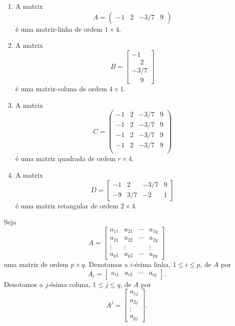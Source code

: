\begin{exemplo}
	\begin{enumerate}
		\item A matrix
		\[
			A = \begin{pmatrix}
				-1 & 2 & -3/7 & 9
			\end{pmatrix}
		\]
		é uma matriz-linha de ordem $1 \times 4$.
		\item A matrix
		\[
			B = \begin{bmatrix}
				-1 \\ \phantom{-}2 \\ -3/7 \\ \phantom{-}9
			\end{bmatrix}
		\]
		é uma matriz-coluna de ordem $4 \times 1$.
		\item A matrix
		\[
			C = \begin{pmatrix}
				-1 & 2 & -3/7 & 9\\
				-1 & 2 & -3/7 & 9\\
				-1 & 2 & -3/7 & 9\\
				-1 & 2 & -3/7 & 9\\
			\end{pmatrix}
		\]
		é uma matriz quadrada de ordem $r \times 4$.
		\item A matrix
		\[
			D = \begin{bmatrix}
				-1 & 2 & -3/7 & 9\\
				-9 & 3/7 & -2 & 1
			\end{bmatrix}
		\]
		é uma matriz retangular de ordem $2 \times 4$.
	\end{enumerate}
\end{exemplo}

Seja
\[
	A = \begin{bmatrix}
		a_{11} & a_{21} & \cdots & a_{1q}\\
		a_{21} & a_{22} & \cdots & a_{2q}\\
		\vdots & \vdots & & \vdots\\
		a_{p1} & a_{p2} & \cdots & a_{pq}
	\end{bmatrix}
\]
uma matriz de ordem $p\times q$. Denotamos a $i$-ésima linha, $1 \le i \le p$, de $A$ por
\[
	A_i = \begin{bmatrix}a_{i1} & a_{i2} & \cdots & a_{iq}\end{bmatrix}.
\]
Denotamos a $j$-ésima coluna, $1 \le j \le q$, de $A$ por
\[
	A^j = \begin{bmatrix}a_{1j} \\ a_{2j} \\ \vdots \\ a_{pj}\end{bmatrix}.
\]

